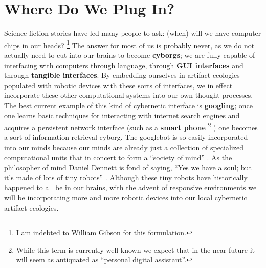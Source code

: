 \section{Where Do We Plug In?}
%
Science fiction stories have led many people to ask: (when) will we have computer chips in our heads?%
\footnote{I am indebted to William Gibson \citeyearpar{gibson_distrust} for this formulation.} 
The answer for most of us is probably never, as we do not actually need to cut into our brains to become \textbf{cyborgs}; we are fully capable of interfacing with computers through language, through \textbf{GUI interfaces} and through \textbf{tangible interfaces}.
By embedding ourselves in artifact ecologies populated with robotic devices with these sorts of interfaces, we in effect incorporate these other computational systems into our own thought processes.
The best current example of this kind of cybernetic interface is \textbf{googling}; once one learns basic techniques for interacting with internet search engines and acquires a persistent network interface (such as a \textbf{smart phone}%
\footnote{While this term is currently well known we expect that in the near future it will seem as antiquated as ``personal digital assistant''.}
) one becomes a sort of information-retrieval cyborg.
The googlebot is so easily incorporated into our minds because our minds are already just a collection of specialized computational units that in concert to form a ``society of mind'' \citep{society_of_mind}. 
As the philosopher of mind Daniel Dennett is fond of saying, ``Yes we have a soul; but it's made of lots of tiny robots'' \citeyearpar[][p. 1]{freedom_evolves}. Although these tiny robots have historically happened to all be in our brains, with the advent of responsive environments we will be incorporating more and more robotic devices into our local cybernetic artifact ecologies.

